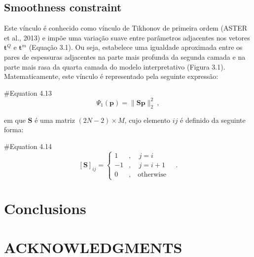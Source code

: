 \documentclass[manuscript]{geophysics}
\begin{document}
\subsection{Smoothness constraint}

Este vínculo é conhecido como vínculo de Tikhonov de primeira ordem (ASTER et al., 2013) e impõe uma variação suave entre parâmetros adjacentes nos vetores $\mathbf{t}^{Q}$ e $\mathbf{t}^{m}$ (Equação 3.1). Ou seja, estabelece uma igualdade aproximada entre os pares de espessuras adjacentes na parte mais profunda da segunda camada e na parte mais rasa da quarta camada do modelo interpretativo (Figura 3.1). Matematicamente, este vínculo é representado pela seguinte expressão:

#Equation 4.13
\begin{equation}
\Psi_{1}(\mathbf{p}) = \| \mathbf{S}\mathbf{p} \|_{2}^{2} \: ,
\end{equation}

em que $\mathbf{S}$ é uma matriz $\left( 2N-2 \right) \times M$, cujo elemento $ij$ é definido da seguinte forma:

#Equation 4.14
\begin{equation}
\left[ \mathbf{S} \right]_{ij} = \begin{cases}
1 &, \quad j = i \\
-1 &, \quad j = i + 1 \\
0 &, \quad \text{otherwise}
\end{cases} \quad .
\end{equation}


\section{Conclusions}

\lipsum[1-3]






\section{ACKNOWLEDGMENTS}

\lipsum[0-1]




 
\end{document}
